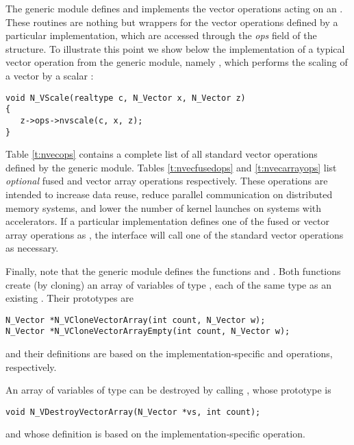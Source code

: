 The generic {\nvector} module defines and implements the vector operations 
acting on an .
These routines are nothing but wrappers for the vector operations defined by
a particular {\nvector} implementation, which are accessed through the {\em ops}
field of the  structure. To illustrate this point we
show below the implementation of a typical vector operation from the
generic {\nvector} module, namely , which performs the scaling of a
vector  by a scalar :
\begin{verbatim}
void N_VScale(realtype c, N_Vector x, N_Vector z) 
{
   z->ops->nvscale(c, x, z);
}
\end{verbatim}
Table \ref{t:nvecops} contains a complete list of all standard vector operations defined
by the generic {\nvector} module. Tables \ref{t:nvecfusedops} and \ref{t:nvecarrayops}
list \textit{optional} fused and vector array operations respectively. These
operations are intended to increase data reuse, reduce parallel communication on
distributed memory systems, and lower the number of kernel launches on systems with
accelerators. If a particular {\nvector} implementation defines one of the fused or
vector array operations as , the {\nvector} interface will call one of the
standard vector operations as necessary.

Finally, note that the generic {\nvector} module defines the functions
 and .  Both functions
create (by cloning) an array of  variables of type , each
of the same type as an existing . Their prototypes are
\begin{verbatim}
N_Vector *N_VCloneVectorArray(int count, N_Vector w);
N_Vector *N_VCloneVectorArrayEmpty(int count, N_Vector w);
\end{verbatim}
and their definitions are based on the implementation-specific  and
 operations, respectively.

An array of variables of type  can be destroyed by
calling , whose prototype is
\begin{verbatim}
void N_VDestroyVectorArray(N_Vector *vs, int count);
\end{verbatim}
and whose definition is based on the implementation-specific  operation.


